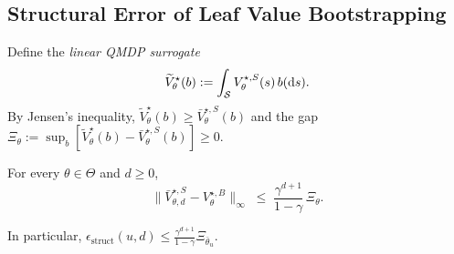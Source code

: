 \subsection{Structural Error of Leaf Value Bootstrapping}
\label{app:structural_proofs}

Define the \emph{linear QMDP surrogate}
\begin{equation}
\widetilde V_\theta^{\star}(b):=\int_{{\mathcal{S}}}V_\theta^{\star,S}(s)\,b(\mathrm ds).
\label{eq:linear_surrogate}
\end{equation}
By Jensen's inequality, $\widetilde V_\theta^{\star}(b)\ge \bar V_\theta^{\star,S}(b)$ and the gap $\Xi_\theta := \sup_b [\widetilde V_\theta^{\star}(b)-\bar V_\theta^{\star,S}(b)] \ge 0$.

\begin{prop}
\label{prop:structural_error}
For every $\theta\in\Theta$ and $d\ge 0$,
\begin{equation}
\|\bar V_{\theta, d}^{\star,S}-V_{\theta}^{\star,B}\|_\infty
\;\le\;
\frac{\gamma^{d+1}}{1-\gamma}\,\Xi_\theta.
\label{eq:qmdp_gap}
\end{equation}
\end{prop}

In particular, $\epsilon_{\mathrm{struct}}(u,d)\le\frac{\gamma^{d+1}}{1-\gamma}\Xi_{\bar\theta_u}$.

